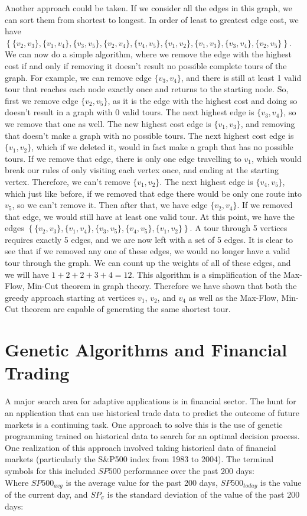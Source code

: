 \documentclass{article}
\renewcommand{\_}{\ifincsname_\else\legacyunderscore\fi}
\begin{document}
Another approach could be taken. If we consider all the edges in this graph, we can sort them from shortest to longest. In order of least to greatest edge cost, we have $\left\{\{v_2, v_3\}, \{v_1, v_4\}, \{v_3, v_5\}, \{v_2, v_4\}, \{v_4, v_5\}, \{v_1, v_2\}, \{v_1, v_3\}, \{v_3, v_4\}, \{v_2, v_5\}\right\}$. We can now do a simple algorithm, where we remove the edge with the highest cost if and only if removing it doesn't result no possible complete tours of the graph. For example, we can remove edge $\{v_3, v_4\}$, and there is still at least 1 valid tour that reaches each node exactly once and returns to the starting node. So, first we remove edge $\{v_2, v_5\}$, as it is the edge with the highest cost and doing so doesn't result in a graph with 0 valid tours. The next highest edge is $\{v_3, v_4\}$, so we remove that one as well. The new highest cost edge is $\{v_1, v_3\}$, and removing that doesn't make a graph with no possible tours. The next highest cost edge is $\{v_1, v_2\}$, which if we deleted it, would in fact make a graph that has no possible tours. If we remove that edge, there is only one edge travelling to $v_1$, which would break our rules of only visiting each vertex once, and ending at the starting vertex. Therefore, we can't remove $\{v_1, v_2\}$. The next highest edge is $\{v_4, v_5\}$, which just like before, if we removed that edge there would be only one route into $v_5$, so we can't remove it. Then after that, we have edge $\{v_2, v_4\}$. If we removed that edge, we would still have at least one valid tour. At this point, we have the edges $\left\{\{v_2, v_3\}, \{v_1, v_4\}, \{v_3, v_5\}, \{v_4, v_5\}, \{v_1, v_2\} \right\}$. A tour through 5 vertices requires exactly 5 edges, and we are now left with a set of 5 edges. It is clear to see that if we removed any one of these edges, we would no longer have a valid tour through the graph. We can count up the weights of all of these edges, and we will have $1 + 2 + 2 + 3 + 4 = 12$. This algorithm is a simplification of the Max-Flow, Min-Cut theorem in graph theory. Therefore we have shown that both the greedy approach starting at vertices $v_1$, $v_2$, and $v_4$ as well as the Max-Flow, Min-Cut theorem are capable of generating the same shortest tour. 

\newpage
\section*{Genetic Algorithms and Financial Trading}
A major search area for adaptive applications is in financial sector. The hunt for an application that can use historical trade data to predict the outcome of future markets is a continuing task. One approach to solve this is the use of genetic programming trained on historical data to search for an optimal decision process. One realization of this approach involved taking historical data of financial markets (particularly the S\&P500 index from 1983 to 2004). The terminal symbols for this included \textbf{$SP500$} performance over the past 200 days:\\
Where $SP500_{avg}$ is the average value for the past 200 days, $SP500_{today}$ is the value of the current day, and $SP_\sigma$ is the standard deviation of the value of the past 200 days:
\end{document}
